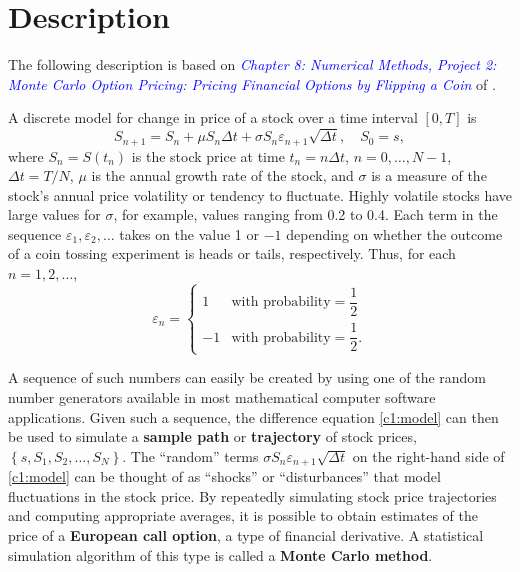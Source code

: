\section{Description}

The following description is based on \textit{\textcolor{blue}{Chapter 8: Numerical Methods, Project 2: Monte Carlo Option Pricing: Pricing Financial Options by Flipping a Coin}} of \cite{mainbook}.

A discrete model for change in price of a stock over a time interval $[0, T]$ is
\begin{equation}
	S_{n+1} = S_n + \mu S_n \Delta t + \sigma S_n \varepsilon_{n+1} \sqrt{\Delta t}, \quad S_0 = s,
	\label{c1:model}
\end{equation}
where $S_n = S(t_n)$ is the stock price at time $t_n = n \Delta t$, $n = 0, \dots, N-1$, $\Delta t = T/N$, $\mu$ is the annual growth rate of the stock, and $\sigma$ is a measure of the stock's annual price volatility or tendency to fluctuate. Highly volatile stocks have large values for $\sigma$, for example, values ranging from 0.2 to 0.4. Each term in the sequence $\varepsilon_1, \varepsilon_2, \dots$ takes on the value 1 or $-1$ depending on whether the outcome of a coin tossing experiment is heads or tails, respectively. Thus, for each $n = 1, 2, \dots$,
\begin{equation}
	\varepsilon_n = 
	\begin{cases} 
		1 & \text{with probability} = \dfrac{1}{2} \\[0.3cm]
		-1 & \text{with probability} = \dfrac{1}{2}.
	\end{cases}
\end{equation}

A sequence of such numbers can easily be created by using one of the random number generators available in most mathematical computer software applications. Given such a sequence, the difference equation \eqref{c1:model} can then be used to simulate a \textbf{sample path} or \textbf{trajectory} of stock prices, $\left\{ s, S_1, S_2, \dots, S_N \right\}$. The ``random'' terms $\sigma S_n \varepsilon_{n+1} \sqrt{\Delta t}$ on the right-hand side of \eqref{c1:model} can be thought of as ``shocks'' or ``disturbances'' that model fluctuations in the stock price. By repeatedly simulating stock price trajectories and computing appropriate averages, it is possible to obtain estimates of the price of a \textbf{European call option}, a type of financial derivative. A statistical simulation algorithm of this type is called a \textbf{Monte Carlo method}.

